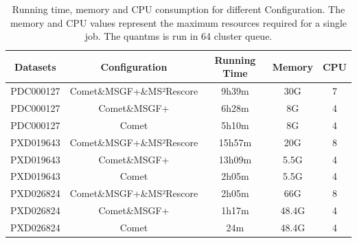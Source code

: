 \documentclass[12pt]{article}
\begin{document}
\renewcommand\thetable{S\arabic{table}}
\setcounter{table}{0}


\begin{table}[h!]
	\centering
	\caption{Running time, memory and CPU consumption for different Configuration. The memory and CPU values represent the maximum resources required for a single job. The quantms is run in 64 cluster queue.}
	\begin{tabular}{|c|c|c|c|c|}
		\hline
		Datasets & Configuration & Running Time & Memory & CPU \\
		\hline
		PDC000127 & Comet\&MSGF+\&MS²Rescore & 9h39m & 30G & 7 \\
		PDC000127 & Comet\&MSGF+ & 6h28m & 8G & 4 \\
		PDC000127 & Comet & 5h10m & 8G & 4 \\
		PXD019643 & Comet\&MSGF+\&MS²Rescore & 15h57m & 20G & 8 \\
		PXD019643 & Comet\&MSGF+ & 13h09m & 5.5G & 4 \\
		PXD019643 & Comet & 2h05m & 5.5G & 4 \\
		PXD026824 & Comet\&MSGF+\&MS²Rescore & 2h05m & 66G & 8 \\
		PXD026824 & Comet\&MSGF+ & 1h17m & 48.4G & 4 \\
		PXD026824 & Comet & 24m & 48.4G & 4 \\
		\hline
	\end{tabular}
	\label{tab:resources_stats}
\end{table}
\end{document}
